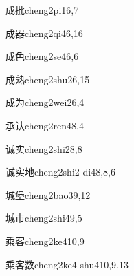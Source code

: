 \begin{verbete}{成批}{cheng2pi1}{6,7}
\end{verbete}

\begin{verbete}{成器}{cheng2qi4}{6,16}
\end{verbete}

\begin{verbete}{成色}{cheng2se4}{6,6}
\end{verbete}

\begin{verbete}{成熟}{cheng2shu2}{6,15}
\end{verbete}

\begin{verbete}{成为}{cheng2wei2}{6,4}
\end{verbete}

\begin{verbete}{承认}{cheng2ren4}{8,4}
\end{verbete}

\begin{verbete}{诚实}{cheng2shi2}{8,8}
\end{verbete}

\begin{verbete}{诚实地}{cheng2shi2 di4}{8,8,6}
\end{verbete}

\begin{verbete}{城堡}{cheng2bao3}{9,12}
\end{verbete}

\begin{verbete}{城市}{cheng2shi4}{9,5}
\end{verbete}

\begin{verbete}{乘客}{cheng2ke4}{10,9}
\end{verbete}

\begin{verbete}{乘客数}{cheng2ke4 shu4}{10,9,13}
\end{verbete}

